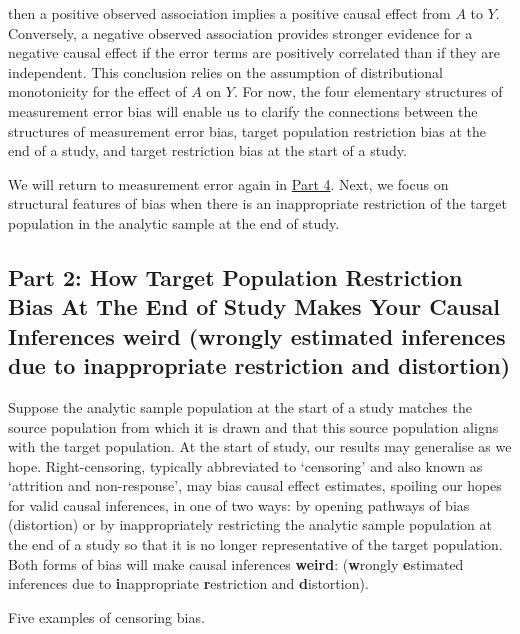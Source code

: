 \documentclass[
  single column]{article}
\begin{document}
then a positive observed association implies a positive causal effect
from \(A\) to \(Y\). Conversely, a negative observed association
provides stronger evidence for a negative causal effect if the error
terms are positively correlated than if they are independent. This
conclusion relies on the assumption of distributional monotonicity for
the effect of \(A\) on \(Y\). For now, the four elementary structures of
measurement error bias will enable us to clarify the connections between
the structures of measurement error bias, target population restriction
bias at the end of a study, and target restriction bias at the start of
a study.

We will return to measurement error again in \hyperref[id-sec-4]{Part
4}. Next, we focus on structural features of bias when there is an
inappropriate restriction of the target population in the analytic
sample at the end of study.

\subsection{\texorpdfstring{Part 2: How Target Population Restriction
Bias At The End of Study Makes Your Causal Inferences weird
(\textbf{w}rongly \textbf{e}stimated inferences due to
\textbf{i}nappropriate \textbf{r}estriction and
\textbf{d}istortion)}{Part 2: How Target Population Restriction Bias At The End of Study Makes Your Causal Inferences weird (wrongly estimated inferences due to inappropriate restriction and distortion)}}\label{id-sec-2}

Suppose the analytic sample population at the start of a study matches
the source population from which it is drawn and that this source
population aligns with the target population. At the start of study, our
results may generalise as we hope. Right-censoring, typically
abbreviated to `censoring' and also known as `attrition and
non-response', may bias causal effect estimates, spoiling our hopes for
valid causal inferences, in one of two ways: by opening pathways of bias
(distortion) or by inappropriately restricting the analytic sample
population at the end of a study so that it is no longer representative
of the target population. Both forms of bias will make causal inferences
\textbf{weird}: (\textbf{w}rongly \textbf{e}stimated inferences due to
\textbf{i}nappropriate \textbf{r}estriction and \textbf{d}istortion).

\begin{table}

\caption{\label{tbl-terminologycensoring}Five examples of censoring
bias.}

\centering{

\terminologycensoring

}

\end{table}%
\end{document}
